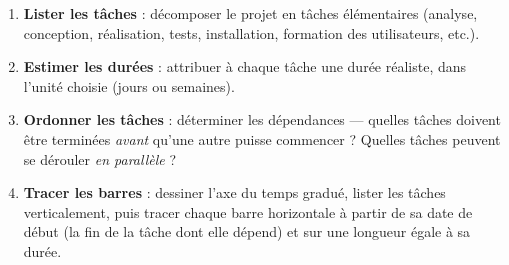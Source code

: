 \documentclass[11pt]{article}
\begin{document}
\begin{methode}
\begin{enumerate}
\item \textbf{Lister les tâches} : décomposer le projet en tâches élémentaires (analyse, conception, réalisation, tests, installation, formation des utilisateurs, etc.).
\item \textbf{Estimer les durées} : attribuer à chaque tâche une durée réaliste, dans l'unité choisie (jours ou semaines).
\item \textbf{Ordonner les tâches} : déterminer les dépendances — quelles tâches doivent être terminées \emph{avant} qu'une autre puisse commencer ? Quelles tâches peuvent se dérouler \emph{en parallèle} ?
\item \textbf{Tracer les barres} : dessiner l'axe du temps gradué, lister les tâches verticalement, puis tracer chaque barre horizontale à partir de sa date de début (la fin de la tâche dont elle dépend) et sur une longueur égale à sa durée.
\end{enumerate}
\end{methode}
\end{document}
